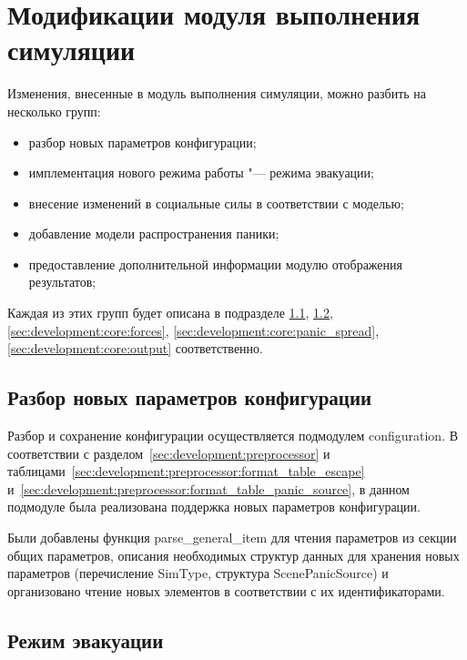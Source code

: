 \FloatBarrier

\section{Модификации модуля выполнения симуляции}
\label{sec:development:core}

Изменения, внесенные в модуль выполнения симуляции, можно разбить на несколько групп:

\begin{itemize}
  \item разбор новых параметров конфигурации;
  \item имплементация нового режима работы "--- режима эвакуации;
  \item внесение изменений в социальные силы в соответствии с моделью;
  \item добавление модели распространения паники;
  \item предоставление дополнительной информации модулю отображения результатов;
\end{itemize}

Каждая из этих групп будет описана в подразделе \ref{sec:development:core:configuration},
\ref{sec:development:core:escape}, \ref{sec:development:core:forces},
\ref{sec:development:core:panic_spread}, \ref{sec:development:core:output} соответственно.


\subsection{Разбор новых параметров конфигурации}
\label{sec:development:core:configuration}

Разбор и сохранение конфигурации осуществляется подмодулем con\-fi\-gu\-ra\-ti\-on.
В соответствии с разделом~\ref{sec:development:preprocessor}
и таблицами~\ref{sec:development:preprocessor:format_table_escape} и~\ref{sec:development:preprocessor:format_table_panic_source},
в данном подмодуле была реализована поддержка новых параметров конфигурации.

Были добавлены функция par\-se\_ge\-ne\-ral\_item для чтения параметров из секции общих параметров,
описания необходимых структур данных для хранения новых параметров (перечисление Sim\-Ty\-pe, структура Sce\-ne\-Pa\-nicSo\-urce)
и организовано чтение новых элементов в соответствии с их идентификаторами.

\subsection{Режим эвакуации}
\label{sec:development:core:escape}


